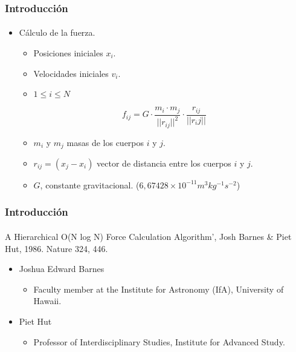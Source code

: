 \frame
{
\frametitle{Introducción}
\framesubtitle{}

\begin{itemize}
    \item Cálculo de la fuerza.
    \begin{itemize}
        \item Posiciones iniciales $x_i$.
        \item Velocidades iniciales $v_i$.
        \item $1 \leq i \leq N$
    \end{itemize}
    $$f_{ij} =G \cdot \frac{m_i \cdot m_j}{||r_{ij}||^{2}} \cdot \frac{r_{ij}}{||r_ij||}$$
    \begin{itemize}
        \item $m_i$ y $m_j$ masas de los cuerpos $i$ y $j$.
        \item $r_{ij} = (x_j - x_i )$ vector de distancia entre los cuerpos $i$ y $j$.
        \item $G$, constante gravitacional. ($6,67428 \times 10^{-11} m^{3} kg^{-1} s^{-2}$)
    \end{itemize}
\end{itemize}
}

\frame
{
\frametitle{Introducción}
\framesubtitle{}

\begin{center}
	A Hierarchical O(N log N) Force Calculation Algorithm', Josh Barnes \& Piet Hut, 1986. Nature 324, 446.
\end{center}
\begin{itemize}
	\item Joshua Edward Barnes
	\begin{itemize}
		\item Faculty member at the Institute for Astronomy (IfA), University of Hawaii.
	\end{itemize}
	\item Piet Hut
	\begin{itemize}
		\item Professor of Interdisciplinary Studies, Institute for Advanced Study.
	\end{itemize}
\end{itemize}
}

